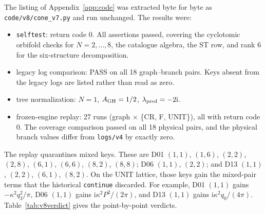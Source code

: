 \documentclass[11pt,a4paper]{article}
\newcommand{\ii}{\mathrm i}
\newcommand{\ka}{\kappa}
\newcommand{\loc}[1]{\nolinkurl{#1}}
\theoremstyle{plain}
\theoremstyle{definition}
\theoremstyle{remark}
\numberwithin{equation}{section}
\begin{document}
The listing of Appendix~\ref{app:code} was extracted byte for byte
as \loc{code/v8/cone_v7.py} and run unchanged. The results were:
\begin{itemize}
\item \loc{selftest}: return code 0. All assertions passed,
covering the cyclotomic orbifold checks for \(N=2,\dots,8\), the
catalogue algebra, the ST row, and rank 6 for the six-structure
decomposition.
\item legacy log comparison: PASS on all 18 graph--branch pairs.
Keys absent from the legacy logs are listed rather than read as
zero.
\item tree normalization: \(N=1\), \(A_{\rm GH}=1/2\),
\(\lambda_{\rm pred}=-2\ii\).
\item frozen-engine replay: 27 runs (graph \(\times\)
\{CR, F, UNIT\}), all with return code 0. The coverage
comparison passed on all 18 physical pairs, and the physical
branch values differ from \loc{logs/v4} by exactly zero.
\end{itemize}
The replay quarantines mixed keys. These are D01 \((1,1)\),
\((1,6)\), \((2,2)\), \((2,8)\), \((6,1)\), \((6,6)\), \((8,2)\),
\((8,8)\); D06 \((1,1)\), \((2,2)\); and D13 \((1,1)\), \((2,2)\),
\((6,1)\), \((8,2)\).
On the UNIT lattice, those keys gain the mixed-pair terms that the
historical \loc{continue} discarded. For example, D01 \((1,1)\)
gains \(-\ka^2q_3^2/\pi\), D06 \((1,1)\) gains
\(\ii\ka^2P^2/(2\pi)\), and D13 \((1,1)\) gains
\(\ii\ka^2q_0/(4\pi)\).
Table~\ref{tab:v8verdict} gives the point-by-point verdicts.
\end{document}
